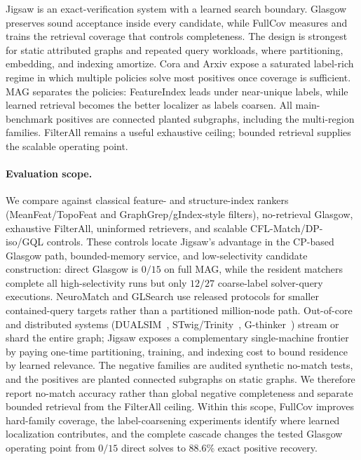 \documentclass[runningheads]{llncs}
\begin{document}
Jigsaw is an exact-verification system with a learned search boundary. Glasgow preserves sound acceptance inside every candidate, while FullCov measures and trains the retrieval coverage that controls completeness. The design is strongest for static attributed graphs and repeated query workloads, where partitioning, embedding, and indexing amortize. Cora and Arxiv expose a saturated label-rich regime in which multiple policies solve most positives once coverage is sufficient. MAG separates the policies: FeatureIndex leads under near-unique labels, while learned retrieval becomes the better localizer as labels coarsen. All main-benchmark positives are connected planted subgraphs, including the multi-region families. FilterAll remains a useful exhaustive ceiling; bounded retrieval supplies the scalable operating point.

\paragraph{Evaluation scope.} We compare against classical feature- and structure-index rankers (MeanFeat/TopoFeat and GraphGrep/gIndex-style filters), no-retrieval Glasgow, exhaustive FilterAll, uninformed retrievers, and scalable CFL-Match/DP-iso/GQL controls. These controls locate Jigsaw's advantage in the CP-based Glasgow path, bounded-memory service, and low-selectivity candidate construction: direct Glasgow is $0/15$ on full MAG, while the resident matchers complete all high-selectivity runs but only $12/27$ coarse-label solver-query executions. NeuroMatch and GLSearch use released protocols for smaller contained-query targets rather than a partitioned million-node path. Out-of-core and distributed systems (DUALSIM~\cite{ref_dualsim}, STwig/Trinity~\cite{ref_trinity}, G-thinker~\cite{ref_gthinker}) stream or shard the entire graph; Jigsaw exposes a complementary single-machine frontier by paying one-time partitioning, training, and indexing cost to bound residence by learned relevance. The negative families are audited synthetic no-match tests, and the positives are planted connected subgraphs on static graphs. We therefore report no-match accuracy rather than global negative completeness and separate bounded retrieval from the FilterAll ceiling. Within this scope, FullCov improves hard-family coverage, the label-coarsening experiments identify where learned localization contributes, and the complete cascade changes the tested Glasgow operating point from $0/15$ direct solves to $88.6\%$ exact positive recovery.
\end{document}
